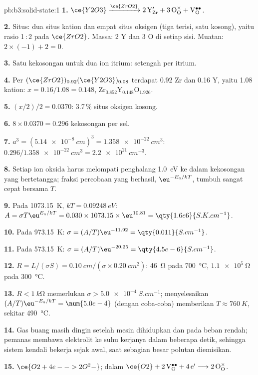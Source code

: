 \begin{solution}{pb:b3:solid-state:1}
\textbf{1.} $\ce{Y2O3} \xrightarrow{\ce{ZrO2}} \mathrm{2\,Y_{Zr}' + 3\,O_O^{\times} + V_O^{\bullet\bullet}}$.

\textbf{2.} Situs: dua situs kation dan empat situs oksigen (tiga terisi, satu kosong),
yaitu rasio 1\,:\,2 pada $\ce{ZrO2}$. Massa: 2 Y dan 3 O di setiap sisi. Muatan: $2 \times (-1) + 2 = 0$.

\textbf{3.} Satu kekosongan untuk dua ion itrium: setengah per itrium.

\textbf{4.} Per $(\ce{ZrO2})_{0.92}(\ce{Y2O3})_{0.08}$ terdapat 0.92 Zr dan 0.16 Y, yaitu 1.08 kation: $x = 0.16/1.08 = 0.148$,
$\mathrm{Zr_{0.852}Y_{0.148}O_{1.926}}$.

\textbf{5.} $(x/2)/2 = 0.0370$: 3.7\,\% situs oksigen kosong.

\textbf{6.} $8 \times 0.0370 = 0.296$ kekosongan per sel.

\textbf{7.} $a^3 = (\qty{5.14e-8}{cm})^3 = \qty{1.358e-22}{cm^3}$: $0.296/\qty{1.358e-22}{cm^3} = \qty{2.2e21}{cm^{-3}}$.

\textbf{8.} Setiap ion oksida harus melompati penghalang \qty{1.0}{eV} ke dalam kekosongan
yang bertetangga; fraksi percobaan yang berhasil, $\eu^{-E_a/kT}$, tumbuh sangat cepat bersama $T$.

\textbf{9.} Pada \qty{1073.15}{K}, $kT = \qty{0.09248}{eV}$: $A = \sigma T\eu^{E_a/kT} = 0.030 \times 1073.15 \times \eu^{10.81} = \qty{1.6e6}{S.K.cm^{-1}}$.

\textbf{10.} Pada \qty{973.15}{K}: $\sigma = (A/T)\eu^{-11.92} = \qty{0.011}{S.cm^{-1}}$.

\textbf{11.} Pada \qty{573.15}{K}: $\sigma = (A/T)\eu^{-20.25} = \qty{4.5e-6}{S.cm^{-1}}$.

\textbf{12.} $R = L/(\sigma S) = \qty{0.10}{cm}/(\sigma \times \qty{0.20}{cm^2})$: \qty{46}{\ohm} pada \qty{700}{\celsius}, $\qty{1.1e5}{\ohm}$ pada \qty{300}{\celsius}.

\textbf{13.} $R < \qty{1}{k\ohm}$ memerlukan $\sigma > \qty{5.0e-4}{S.cm^{-1}}$; menyelesaikan $(A/T)\eu^{-E_a/kT} = \num{5.0e-4}$ (dengan coba-coba)
memberikan $T \approx \qty{760}{K}$, sekitar \qty{490}{\celsius}.

\textbf{14.} Gas buang masih dingin setelah mesin dihidupkan dan pada beban rendah; pemanas membawa
elektrolit ke suhu kerjanya dalam beberapa detik, sehingga sistem kendali
bekerja sejak awal, saat sebagian besar polutan diemisikan.

\textbf{15.} $\ce{O2 + 4e- -> 2O^2-}$; dalam  $\ce{O2} + \mathrm{2\,V_O^{\bullet\bullet} + 4\,e'} \longrightarrow \mathrm{2\,O_O^{\times}}$.


\end{solution}
